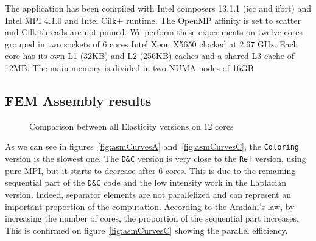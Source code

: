 \documentclass[10pt]{IOS-Book-Article}
\begin{document}
The application has been compiled with Intel composers 13.1.1 (icc and ifort) and Intel MPI 4.1.0 and Intel Cilk+ runtime. The OpenMP affinity is set to scatter and Cilk threads are not pinned.
We perform these experiments on twelve cores grouped in two sockets of 6 cores Intel Xeon X5650 clocked at 2.67 GHz.
Each core has its own L1 (32KB) and L2 (256KB) caches and a shared L3 cache of 12MB. The main memory is divided in two NUMA nodes of 16GB.

\subsection{FEM Assembly results}

\begin{figure}[htp]
 \caption{Comparison between all Elasticity versions on 12 cores}
 \label{fig:12Cores}
\end{figure}

As we can see in figures~\ref{fig:asmCurvesA} and~\ref{fig:asmCurvesC}, the {\tt Coloring} version is the slowest one.
The {\tt D\&C} version is very close to the {\tt Ref} version, using pure MPI, but it starts to decrease after 6 cores. 
This is due to the remaining sequential part of the {\tt D\&C} code and the low intensity work in the Laplacian version.
Indeed, separator elements are not parallelized and can represent an important proportion of the computation.
According to the Amdahl's law, by increasing the number of cores, the proportion of the sequential part increases.
This is confirmed on figure~\ref{fig:asmCurvesC} showing the parallel efficiency.
\end{document}
